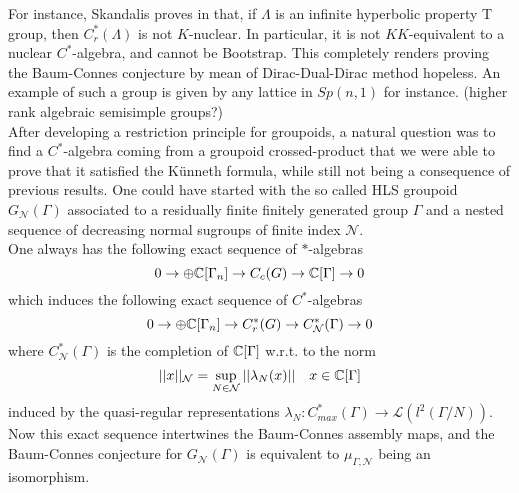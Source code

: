 For instance, Skandalis proves in \cite{SkandalisNotion} that, if $\Lambda$ is an infinite hyperbolic property T group, then $C_r^*(\Lambda)$ is not $K$-nuclear. In particular, it is not $KK$-equivalent to a nuclear $C^*$-algebra, and cannot be Bootstrap. This completely renders proving the Baum-Connes conjecture by mean of Dirac-Dual-Dirac method hopeless. An example of such a group is given by any lattice in $Sp(n,1)$ for instance. (higher rank algebraic semisimple groups?) \\

After developing a restriction principle for groupoids, a natural question was to find a $C^*$-algebra coming from a groupoid crossed-product that we were able to prove that it satisfied the Künneth formula, while still not being a consequence of previous results. One could have started with the so called HLS groupoid $G_{\mathcal N}(\Gamma)$ associated to a residually finite finitely generated group $\Gamma$ and a nested sequence of decreasing  normal sugroups of finite index $\mathcal N$.\\

One always has the following exact sequence of $*$-algebras
\[ 0 \rightarrow \oplus \mathbb C[\Gamma_n] \rightarrow C_c(G) \rightarrow \mathbb C [\Gamma]  \rightarrow 0\]      
which induces the following exact sequence of $C^*$-algebras
\[ 0 \rightarrow \oplus \mathbb C[\Gamma_n] \rightarrow C_r^*(G) \rightarrow C^*_{\mathcal N} (\Gamma)  \rightarrow 0\]   
where $C^*_{\mathcal N}(\Gamma)$ is the completion of $\mathbb C[\Gamma]$ w.r.t. to the norm
\[||x||_{\mathcal N} = \sup_{N\in \mathcal N} ||\lambda_{N} (x)||\quad x\in \mathbb C[\Gamma] \]
induced by the quasi-regular representations $\lambda_{N} : C_{max}^*(\Gamma) \rightarrow \mathcal L(l^2(\Gamma/ N))$.  \\ 

Now this exact sequence intertwines the Baum-Connes assembly maps, and the Baum-Connes conjecture for $G_{\mathcal N}(\Gamma)$ is equivalent to $\mu_{\Gamma,\mathcal N}$ being an isomorphism. \\

